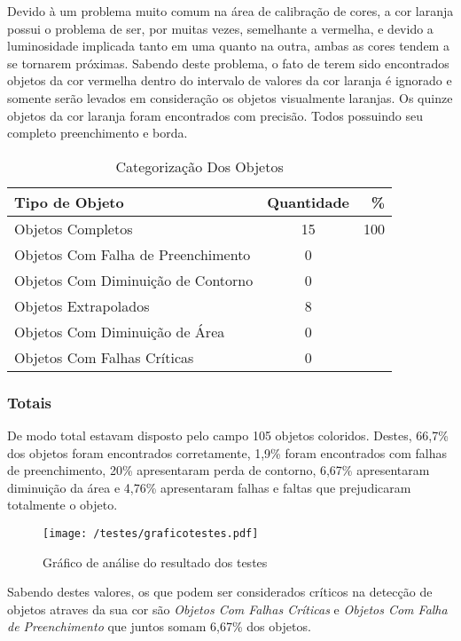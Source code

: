 	Devido à um problema muito comum na área de calibração de cores, a cor laranja possui o problema de ser, por muitas vezes, semelhante a vermelha, e devido a luminosidade implicada tanto em uma quanto na outra, ambas as cores tendem a se tornarem próximas.
	Sabendo deste problema, o fato de terem sido encontrados objetos da cor vermelha dentro do intervalo de valores da cor laranja é ignorado e somente serão levados em consideração os objetos visualmente laranjas.
	Os quinze objetos da cor laranja foram encontrados com precisão. Todos possuindo seu completo preenchimento e borda.
	
\begin{table}[h]
\centering
\begin{tabular}{l|c|r}
Tipo de Objeto & Quantidade  & \% \\ %
\hline                               %
Objetos Completos &  15 & 100 \\
\hline 
Objetos Com Falha de Preenchimento & 0 \\
\hline 
Objetos Com Diminuição de Contorno &  0 \\
\hline 
Objetos Extrapolados & 8 \\
\hline 
Objetos Com Diminuição de Área &  0 \\
\hline 
Objetos Com Falhas Críticas & 0 \\
\hline 
\end{tabular}
\caption{Categorização Dos Objetos}
\end{table}
\newpage
\subsubsection{Totais}
De modo total estavam disposto pelo campo 105 objetos coloridos. Destes, 66,7\% dos objetos foram encontrados corretamente, 1,9\% foram encontrados com falhas de preenchimento, 20\% apresentaram perda de contorno, 6,67\% apresentaram diminuição da área e 4,76\% apresentaram falhas e faltas que prejudicaram totalmente o objeto.
	\begin{figure}[H]
		\centering
		\texttt{[image: /testes/graficotestes.pdf]}
		\caption{Gráfico de análise do resultado dos testes}
		\label{disposicaoparte}
	\end{figure}
	
	
	Sabendo destes valores, os que podem ser considerados críticos na detecção de objetos atraves da sua cor são \textit{Objetos Com Falhas Críticas} e \textit{Objetos Com Falha de Preenchimento} que juntos somam 6,67\% dos objetos.
